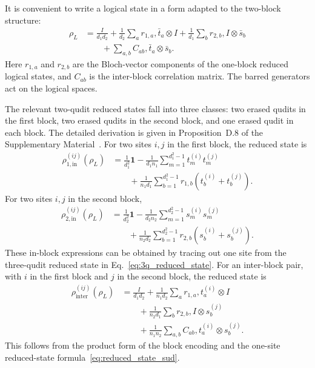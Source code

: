 \documentclass[10pt,twocolumn,superscriptaddress,aps,amsmath,amssymb,citeautoscript,floatfix,prx,longbibliography]{revtex4-2}
\theoremstyle{plain}
\theoremstyle{plain}
\theoremstyle{plain}
\theoremstyle{plain}
\theoremstyle{plain}
\theoremstyle{plain}
\begin{document}
It is convenient to write a logical state in a form adapted to the two-block structure:
$$
\begin{aligned}
\rho_L
&=
\frac{I}{d_1d_2}
+
\frac{1}{d_2}
\sum_a r_{1,a},\bar t_a\otimes I
+
\frac{1}{d_1}
\sum_b r_{2,b},I\otimes\bar s_b
\\
&\qquad
+
\sum_{a,b}
C_{ab},\bar t_a\otimes\bar s_b .
\end{aligned}
$$
Here $r_{1,a}$ and $r_{2,b}$ are the Bloch-vector components of the one-block reduced logical states, and $C_{ab}$ is the inter-block correlation matrix. The barred generators act on the logical spaces.

The relevant two-qudit reduced states fall into three classes: two erased qudits in the first block, two erased qudits in the second block, and one erased qudit in each block. The detailed derivation is given in Proposition~D.8 of the Supplementary Material~\cite{SuppMat}. For two sites $i,j$ in the first block, the reduced state is
$$
\begin{aligned}
\rho_{1,\mathrm{in}}^{(ij)}(\rho_L)
&=
\frac{1}{d_1^2}\mathbf 1
-
\frac{1}{d_1n_1}
\sum_{m=1}^{d_1^2-1}
t_m^{(i)}t_m^{(j)}
\\
&\qquad
+
\frac{1}{n_1d_1}
\sum_{b=1}^{d_1^2-1}
r_{1,b}
\left(
t_b^{(i)}
+
t_b^{(j)}
\right).
\end{aligned}
$$
For two sites $i,j$ in the second block,
$$
\begin{aligned}
\rho_{2,\mathrm{in}}^{(ij)}(\rho_L)
&=
\frac{1}{d_2^2}\mathbf 1
-
\frac{1}{d_2n_2}
\sum_{m=1}^{d_2^2-1}
s_m^{(i)}s_m^{(j)}
\\
&\qquad
+
\frac{1}{n_2d_2}
\sum_{b=1}^{d_2^2-1}
r_{2,b}
\left(
s_b^{(i)}
+
s_b^{(j)}
\right).
\end{aligned}
$$
These in-block expressions can be obtained by tracing out one site from the three-qudit reduced state in Eq.~\eqref{eq:3q_reduced_state}. For an inter-block pair, with $i$ in the first block and $j$ in the second block, the reduced state is
$$
\begin{aligned}
\rho_{\mathrm{inter}}^{(ij)}(\rho_L)
&=
\frac{I}{d_1d_2}
+
\frac{1}{n_1d_2}
\sum_a r_{1,a},t_a^{(i)}\otimes I
\\
&\qquad
+
\frac{1}{n_2d_1}
\sum_b r_{2,b},I\otimes s_b^{(j)} \\
&\qquad
+
\frac{1}{n_1n_2}
\sum_{a,b}
C_{ab},t_a^{(i)}\otimes s_b^{(j)} .
\end{aligned}
$$
This follows from the product form of the block encoding and the one-site reduced-state formula~\eqref{eq:reduced_state_sud}.
\end{document}
